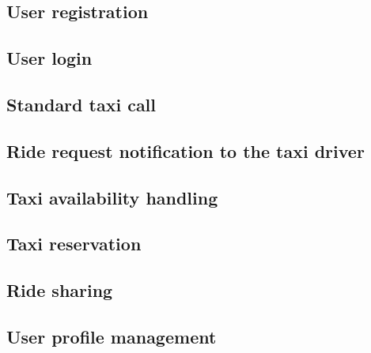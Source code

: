 \subsection{User registration}


\subsection{User login}


\subsection{Standard taxi call}


\subsection{Ride request notification to the taxi driver}


\subsection{Taxi availability handling}


\subsection{Taxi reservation}


\subsection{Ride sharing}


\subsection{User profile management}
